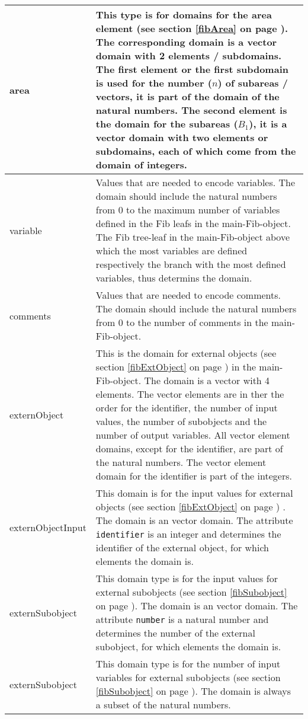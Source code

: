 \begin{center}
\begin{longtable}{|p{25mm}|p{100mm}|}
	area & This type is for domains for the area element (see section \ref{fibArea} on page \pageref{fibArea}).  The corresponding domain is a vector domain with 2 elements / subdomains. The first element or the first subdomain is used for the number ($n$) of subareas / vectors, it is part of the domain of the natural numbers. The second element is the domain for the subareas ($B_{1}$), it is a vector domain with two elements or subdomains, each of which come from the domain of integers. \\\hline
	variable & Values that are needed to encode variables. The domain should include the natural numbers from 0 to the maximum number of variables defined in the Fib leafs in the main-Fib-object. The Fib tree-leaf in the main-Fib-object above which the most variables are defined respectively the branch with the most defined variables, thus determins the domain.\\\hline
	comments & Values that are needed to encode comments. The domain should include the natural numbers from 0 to the number of comments in the main-Fib-object.\\\hline
	externObject & This is the domain for external objects (see section \ref{fibExtObject} on page \pageref{fibExtObject}) in the main-Fib-object. The domain is a vector with 4 elements. The vector elements are in ther the order for the identifier, the number of input values, the number of subobjects and the number of output variables. All vector element domains, except for the identifier, are part of the natural numbers. The vector element domain for the identifier is part of the integers.\\\hline
	externObjectInput & This domain is for the input values for external objects (see section \ref{fibExtObject} on page \pageref{fibExtObject}) . The domain is an vector domain. The attribute \verb|identifier| is an integer and determines the identifier of the external object, for which elements the domain is.\\\hline
	externSubobject & This domain type is for the input values for external subobjects (see section \ref{fibSubobject} on page \pageref{fibSubobject}). The domain is an vector domain. The attribute \verb|number| is a natural number and determines the number of the external subobject, for which elements the domain is.\\\hline
	externSubobject & This domain type is for the number of input variables for external subobjects (see section \ref{fibSubobject} on page \pageref{fibSubobject}). The domain is always a subset of the natural numbers.\\\hline

\end{longtable}
\end{center}
